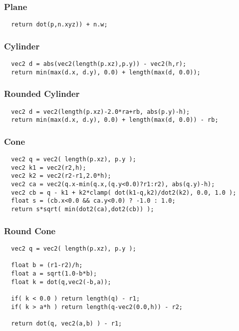 \documentclass[../pbr.text]{subfile}
\begin{document}
\subsubsection{Plane}%
\label{ssub:plane}
\begin{verbatim}
  return dot(p,n.xyz)) + n.w;
\end{verbatim}

\subsubsection{Cylinder}%
\label{ssub:cylinder}
\begin{verbatim}
  vec2 d = abs(vec2(length(p.xz),p.y)) - vec2(h,r);
  return min(max(d.x, d.y), 0.0) + length(max(d, 0.0));
\end{verbatim}

\subsubsection{Rounded Cylinder}%
\label{ssub:rounded_cylinder}
\begin{verbatim}
  vec2 d = vec2(length(p.xz)-2.0*ra+rb, abs(p.y)-h);
  return min(max(d.x, d.y), 0.0) + length(max(d, 0.0)) - rb;
\end{verbatim}

\subsubsection{Cone}%
\label{ssub:cone}
\begin{verbatim}
  vec2 q = vec2( length(p.xz), p.y );
  vec2 k1 = vec2(r2,h);
  vec2 k2 = vec2(r2-r1,2.0*h);
  vec2 ca = vec2(q.x-min(q.x,(q.y<0.0)?r1:r2), abs(q.y)-h);
  vec2 cb = q - k1 + k2*clamp( dot(k1-q,k2)/dot2(k2), 0.0, 1.0 );
  float s = (cb.x<0.0 && ca.y<0.0) ? -1.0 : 1.0;
  return s*sqrt( min(dot2(ca),dot2(cb)) );
\end{verbatim}

\subsubsection{Round Cone}%
\label{ssub:round_cone}
\begin{verbatim}
  vec2 q = vec2( length(p.xz), p.y );

  float b = (r1-r2)/h;
  float a = sqrt(1.0-b*b);
  float k = dot(q,vec2(-b,a));

  if( k < 0.0 ) return length(q) - r1;
  if( k > a*h ) return length(q-vec2(0.0,h)) - r2;

  return dot(q, vec2(a,b) ) - r1;
\end{verbatim}
\end{document}
